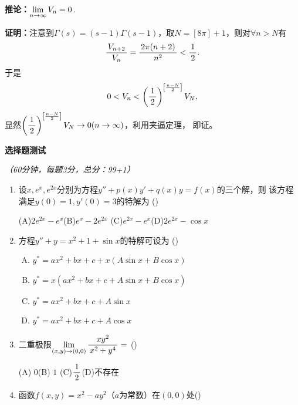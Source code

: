 {\bf 推论：}$\lim\limits_{n\to\infty} V_n=0$.

{\bf 证明：}注意到$\Gamma(s)=(s-1)\Gamma(s-1)$，取$N=[8\pi]+1$，则对$\forall n>N$有
$$\displaystyle\frac{\,{V_{n+2}}\,}{\,{V_n}\,}=\displaystyle\frac{\,{2\pi(n+2)}\,}{\,{n^2}\,}<\displaystyle\frac{\,{1}\,}{\,{2}\,}.$$
于是
$$0<V_n<\left(\displaystyle\frac{\,{1}\,}{\,{2}\,}\right)^{\left[\frac{n-N}2\right]}V_N,$$
显然$\left(\displaystyle\frac{\,{1}\,}{\,{2}\,}\right)^{\left[\frac{n-N}2\right]}V_N\to0(n\to\infty)$，利用夹逼定理，
即证。

\newpage

\begin{center}
	{\Large\bf 选择题测试}
	
	{\it （60分钟，每题3分，总分：99+1）}
\end{center}

\begin{enumerate}
  \item 设$x,e^x,e^{2x}$分别为方程$y''+p(x)y'+q(x)y=f(x)$的三个解，则
  该方程满足$y(0)=1,y'(0)=3$的特解为
  (\underline{\hspace{1cm}})
  
  (A)$2e^{2x}-e^x$\hspace{1cm}(B)$e^x-2e^{2x}$ \hspace{1cm}
  (C)$e^{2x}-e^x$\hspace{1cm}(D)$2e^{2x}-\cos x$
  \item 方程$y''+y=x^2+1+\sin x$的特解可设为
  (\underline{\hspace{1cm}})
  \begin{enumerate}[(A)]
    \item $y^*=ax^2+bx+c+x(A\sin x+B\cos x)$
    \item $y^*=x(ax^2+bx+c+A\sin x+B\cos x)$
    \item $y^*=ax^2+bx+c+A\sin x$
    \item $y^*=ax^2+bx+c+A\cos x$
  \end{enumerate}
  \item 二重极限$\lim\limits_{(x,y)\to(0,0)}\displaystyle\frac{\,{xy^2}\,}{\,{x^2+y^4}\,}=$
  (\underline{\hspace{1cm}})
  
  (A) $0$\hspace{1cm}(B) $1$  \hspace{1cm}(C)$\displaystyle\frac{\,{1}\,}{\,{2}\,}$\hspace{1cm}(D)不存在
  \item 函数$f(x,y)=x^2-ay^2$（$a$为常数）在$(0,0)$处(\underline{\hspace{1cm}})
  

\end{enumerate}
